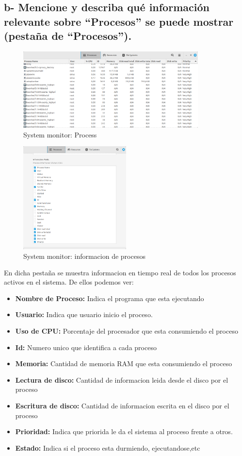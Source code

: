 \documentclass{article}
\begin{document}
\subsection*{b- Mencione y describa qué información relevante sobre “Procesos” se puede mostrar (pestaña de “Procesos”).}

\begin{figure}[h]
  \centering
  \includegraphics[width=0.85\textwidth]{resources/ej2b2.png}
  \caption{System monitor: Process}
\end{figure}

\begin{figure}[h]
  \centering
  \includegraphics[width=0.5\textwidth]{resources/ej2b.png}
  \caption{System monitor: informacion de procesos}
\end{figure}

\noindent
En dicha pestaña se muestra informacion en tiempo real de todos los procesos activos en el sistema. De ellos podemos ver:
\begin{itemize}
  \item \textbf{Nombre de Proceso: }Indica el programa que esta ejecutando
  \item \textbf{Usuario:} Indica que usuario inicio el proceso.
  \item \textbf{Uso de CPU:} Porcentaje del procesador que esta consumiendo el proceso
  \item \textbf{Id:} Numero unico que identifica a cada proceso
  \item \textbf{Memoria:} Cantidad de memoria RAM que esta consumiendo el proceso
  \item \textbf{Lectura de disco:} Cantidad de informacion leida desde el disco por el proceso
  \item \textbf{Escritura de disco:} Cantidad de informacion escrita en el disco por el proceso
  \item \textbf{Prioridad:} Indica que priorida le da el sistema al proceso frente a otros.
  \item \textbf{Estado:} Indica si el proceso esta durmiendo, ejecutandose,etc
\end{itemize}
  
\end{document}

